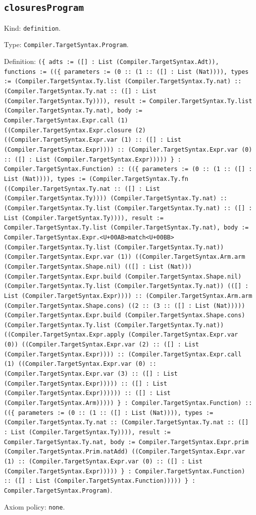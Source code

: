 \documentclass[11pt]{article}
\begin{document}
\subsection*{\texttt{closuresProgram}}
\noindent Kind: \texttt{definition}.\par
\noindent Type: \texttt{Compiler.TargetSyntax.Program}.\par
\noindent Definition: \texttt{(\{ adts := ([] : List (Compiler.TargetSyntax.Adt)), functions := ((\{ parameters := (0 :: (1 :: ([] : List (Nat)))), types := (Compiler.TargetSyntax.Ty.list (Compiler.TargetSyntax.Ty.nat) :: (Compiler.TargetSyntax.Ty.nat :: ([] : List (Compiler.TargetSyntax.Ty)))), result := Compiler.TargetSyntax.Ty.list (Compiler.TargetSyntax.Ty.nat), body := Compiler.TargetSyntax.Expr.call (1) ((Compiler.TargetSyntax.Expr.closure (2) ((Compiler.TargetSyntax.Expr.var (1) :: ([] : List (Compiler.TargetSyntax.Expr)))) :: (Compiler.TargetSyntax.Expr.var (0) :: ([] : List (Compiler.TargetSyntax.Expr))))) \} : Compiler.TargetSyntax.Function) :: ((\{ parameters := (0 :: (1 :: ([] : List (Nat)))), types := (Compiler.TargetSyntax.Ty.fn ((Compiler.TargetSyntax.Ty.nat :: ([] : List (Compiler.TargetSyntax.Ty)))) (Compiler.TargetSyntax.Ty.nat) :: (Compiler.TargetSyntax.Ty.list (Compiler.TargetSyntax.Ty.nat) :: ([] : List (Compiler.TargetSyntax.Ty)))), result := Compiler.TargetSyntax.Ty.list (Compiler.TargetSyntax.Ty.nat), body := Compiler.TargetSyntax.Expr.<U+00AB>match<U+00BB> (Compiler.TargetSyntax.Ty.list (Compiler.TargetSyntax.Ty.nat)) (Compiler.TargetSyntax.Expr.var (1)) ((Compiler.TargetSyntax.Arm.arm (Compiler.TargetSyntax.Shape.nil) (([] : List (Nat))) (Compiler.TargetSyntax.Expr.build (Compiler.TargetSyntax.Shape.nil) (Compiler.TargetSyntax.Ty.list (Compiler.TargetSyntax.Ty.nat)) (([] : List (Compiler.TargetSyntax.Expr)))) :: (Compiler.TargetSyntax.Arm.arm (Compiler.TargetSyntax.Shape.cons) ((2 :: (3 :: ([] : List (Nat))))) (Compiler.TargetSyntax.Expr.build (Compiler.TargetSyntax.Shape.cons) (Compiler.TargetSyntax.Ty.list (Compiler.TargetSyntax.Ty.nat)) ((Compiler.TargetSyntax.Expr.apply (Compiler.TargetSyntax.Expr.var (0)) ((Compiler.TargetSyntax.Expr.var (2) :: ([] : List (Compiler.TargetSyntax.Expr)))) :: (Compiler.TargetSyntax.Expr.call (1) ((Compiler.TargetSyntax.Expr.var (0) :: (Compiler.TargetSyntax.Expr.var (3) :: ([] : List (Compiler.TargetSyntax.Expr))))) :: ([] : List (Compiler.TargetSyntax.Expr)))))) :: ([] : List (Compiler.TargetSyntax.Arm))))) \} : Compiler.TargetSyntax.Function) :: ((\{ parameters := (0 :: (1 :: ([] : List (Nat)))), types := (Compiler.TargetSyntax.Ty.nat :: (Compiler.TargetSyntax.Ty.nat :: ([] : List (Compiler.TargetSyntax.Ty)))), result := Compiler.TargetSyntax.Ty.nat, body := Compiler.TargetSyntax.Expr.prim (Compiler.TargetSyntax.Prim.natAdd) ((Compiler.TargetSyntax.Expr.var (1) :: (Compiler.TargetSyntax.Expr.var (0) :: ([] : List (Compiler.TargetSyntax.Expr))))) \} : Compiler.TargetSyntax.Function) :: ([] : List (Compiler.TargetSyntax.Function))))) \} : Compiler.TargetSyntax.Program)}.\par
\noindent Axiom policy: \texttt{none}.\par
\end{document}
